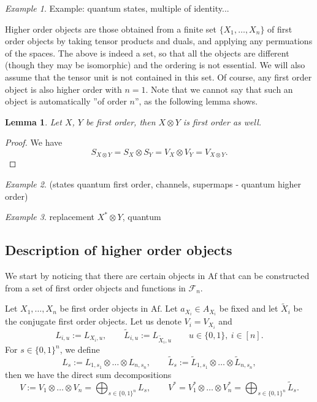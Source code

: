 \documentclass[12pt]{article}
\newtheorem{lemma}{Lemma}
\theoremstyle{definition}
\theoremstyle{remark}
\newtheorem{exm}{Example}
\def\Fe{\mathcal F}
\def \Af{\mathrm{Af}}
\begin{document}
\begin{exm} Example: quantum states, multiple of identity...

\end{exm}


Higher order objects are those obtained from a finite set $\{X_1,\dots,X_n\}$ of first order objects by
taking tensor products and duals, and applying any permuations of the spaces. The above is indeed a set, so that all the objects are
different (though they may be isomorphic) and the ordering is not essential. We will also
assume that the tensor unit is not contained in this set. Of course, any first order
object is also higher order with $n=1$. Note that we cannot say that
such an object is automatically ''of order $n$'', as the following lemma shows. 

\begin{lemma}\label{lemma:1ordertensor} Let $X$, $Y$ be first order, then $X\otimes Y$ is
first order as well.

\end{lemma}

\begin{proof} We have
\[
S_{X\otimes Y}=S_X\otimes S_Y=V_X\otimes V_Y=V_{X\otimes Y}.
\]

\end{proof}




\begin{exm} (states quantum first order, channels,  supermaps - quantum higher order)

\end{exm}






\begin{exm} replacement $X^*\otimes Y$, quantum
\end{exm}

\subsection{Description of higher order objects}


We start by noticing that there are certain objects in $\Af$ that can be constructed from
a set of  first order objects and functions in $\Fe_n$. 

Let $X_1,\dots,X_n$ be first order objects in $\Af$. Let $a_{X_i}\in A_{X_i}$ be fixed and
let $\tilde X_i$ be the conjugate first order objects. Let us denote $V_i=V_{X_i}$ and 
\[
L_{i,u}:= L_{X_i,u},\qquad  \tilde L_{i,u}:= L_{\tilde X_i,u} \qquad u\in \{0,1\},\ i\in [n].
\]
For $s\in \{0,1\}^n$, we define
\[
L_s:=L_{1,s_1}\otimes\dots \otimes L_{n,s_n}, \qquad \tilde L_s:=\tilde
L_{1,s_1}\otimes\dots \otimes \tilde L_{n,s_n},
\]
then we have the direct sum decompositions 
\[
V:=V_1\otimes \dots \otimes V_n=\bigoplus_{s\in \{0,1\}^n} L_s,\qquad V^*=V_1^*\otimes
\dots\otimes V_n^*=\bigoplus_{s\in \{0,1\}^n} \tilde L_s.
\]
\end{document}
